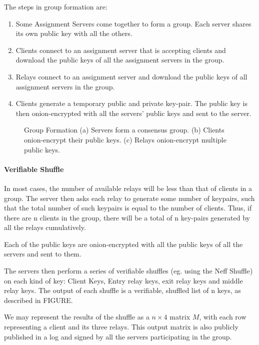 The steps in group formation are: 
\begin{enumerate} 
\item Some Assignment Servers come together to form a group. Each server shares 
its own public key with all the others. 
\item Clients connect to an assignment server that is accepting clients and 
download the public keys of all the assignment servers in the group.
\item Relays connect to an assignment server and download the public
keys of all assignment servers in the group. 
\item Clients generate a temporary public and private key-pair. The public key 
is then onion-encrypted with all the servers' public keys and sent to the server.
\end{enumerate}

\begin{figure}[htbp]
  \centering
  \caption{Group Formation (a) Servers form a consensus group. 
    (b) Clients onion-encrypt their public keys. 
    (c) Relays onion-encrypt multiple public keys.}
  \label{rfidtag_testing}
\end{figure}

\paragraph{Verifiable Shuffle} 
In most cases, the number of available relays will be less than that of clients 
in a group. The server then asks each relay to generate some number of 
keypairs, such that the total number of such keypairs is equal to the number of 
clients. Thus, if there are n clients in the group, there will be a total of n
key-pairs generated by all the relays cumulatively. 

Each of the public keys are onion-encrypted with all the public keys of all the 
servers and sent to them.

The servers then perform a series of verifiable shuffles (eg. using the Neff
Shuffle\cite{neff2001verifiable}) on each kind of key: Client Keys, Entry relay 
keys, exit relay keys and middle relay keys. The output of each shuffle is a 
verifiable, shuffled list of n keys, as described in FIGURE. 

We may represent the results of the shuffle as a $n \times 4$ matrix $M$, with 
each row representing a client and its three relays. This output matrix is also 
publicly published in a log and signed by all the servers participating in the 
group.

